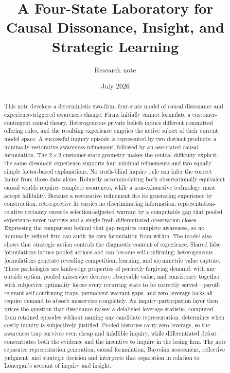 \documentclass[11pt]{article}
\title{A Four-State Laboratory for\\
Causal Dissonance, Insight, and Strategic Learning}
\author{Research note}
\date{July 2026}
\begin{document}
\maketitle

\begin{abstract}
This note develops a deterministic two-firm, four-state model of causal
dissonance and experience-triggered awareness change.  Firms initially cannot formulate a
customer-contingent causal theory.  Heterogeneous private beliefs induce
different committed offering rules, and the resulting experience
empties the active subset of their current model space.  A successful inquiry
episode is represented by two distinct products: a minimally restorative
awareness refinement, followed by an associated causal formulation.  The
$2\times2$ customer-state geometry makes
the central difficulty explicit: the same dissonant experience supports four
minimal refinements and two equally simple factor-based explanations.  No
truth-blind inquiry rule can infer the correct factor from those data alone.
Robustly accommodating both observationally equivalent causal worlds requires
complete awareness, while a non-exhaustive technology must accept fallibility.
Because a restorative refinement fits its generating experience by
construction, retrospective fit carries no discriminating information:
representation-relative certainty exceeds selection-adjusted warrant by a
computable gap that pooled experience never narrows and a single fresh
differentiated observation closes.  Expressing the comparison behind that gap
requires complete awareness, so no minimally refined firm can audit its own
formulation from within.
The model also shows that strategic action controls the diagnostic content of
experience.  Shared false formulations induce pooled actions and can become
self-confirming; heterogeneous formulations generate revealing competition,
learning, and asymmetric value capture.  These pathologies are knife-edge
properties of perfectly forgiving demand: with any outside option, pooled
misservice destroys observable value, and consistency together with
subjective optimality forces every recurring state to be correctly
served---payoff-relevant self-confirming traps, permanent warrant gaps, and
zero-leverage locks all require demand to absorb misservice completely.  An
inquiry-participation layer then
prices the question that dissonance raises: a delabeled leverage statistic,
computed from retained episodes without naming any candidate representation,
determines when costly inquiry is subjectively justified.  Pooled histories
carry zero leverage, so the awareness trap survives even cheap and infallible
inquiry, while differentiated defeat concentrates both the evidence and the
incentive to inquire in the losing firm.  The note separates representation
generation, causal formulation, Bayesian assessment, reflective judgment, and strategic decision and
interprets that separation in relation to Lonergan's account of inquiry and
insight.
\end{abstract}
\end{document}
